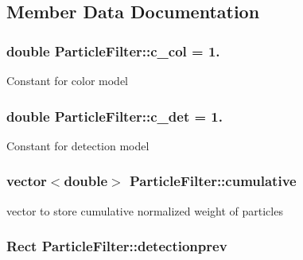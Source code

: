 \subsection{Member Data Documentation}
\hypertarget{classParticleFilter_af962f9679adc8d9b9a7231ed9385cc77}{
\subsubsection[{c\-\_\-col}]{\setlength{\rightskip}{0pt plus 5cm}double Particle\-Filter\-::c\-\_\-col = 1.\hspace{0.3cm}{\ttfamily [protected]}}}\label{classParticleFilter_af962f9679adc8d9b9a7231ed9385cc77}
Constant for color model \hypertarget{classParticleFilter_ac7dbf011c2d2605fe32dcd2223af0d94}{
\subsubsection[{c\-\_\-det}]{\setlength{\rightskip}{0pt plus 5cm}double Particle\-Filter\-::c\-\_\-det = 1.\hspace{0.3cm}{\ttfamily [protected]}}}\label{classParticleFilter_ac7dbf011c2d2605fe32dcd2223af0d94}
Constant for detection model \hypertarget{classParticleFilter_a608013ea3cc68c34c465611444a6e25d}{
\subsubsection[{cumulative}]{\setlength{\rightskip}{0pt plus 5cm}vector$<$double$>$ Particle\-Filter\-::cumulative\hspace{0.3cm}{\ttfamily [protected]}}}\label{classParticleFilter_a608013ea3cc68c34c465611444a6e25d}
vector to store cumulative normalized weight of particles \hypertarget{classParticleFilter_a594c1a59fdf0251267c64828850a085f}{
\subsubsection[{detectionprev}]{\setlength{\rightskip}{0pt plus 5cm}Rect Particle\-Filter\-::detectionprev\hspace{0.3cm}{\ttfamily [protected]}}}\label{classParticleFilter_a594c1a59fdf0251267c64828850a085f}
